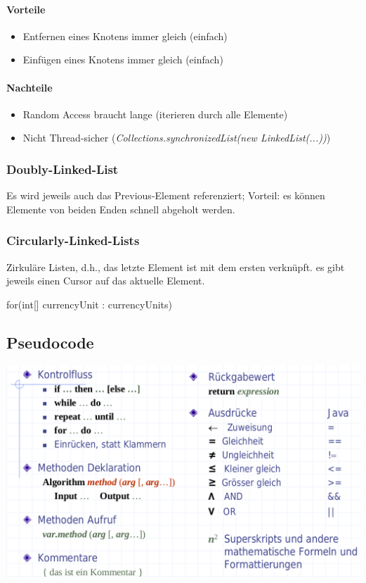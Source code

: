 \paragraph{Vorteile}
\begin{itemize}
	\item Entfernen eines Knotens immer gleich (einfach)
	\item Einfügen eines Knotens immer gleich (einfach)
\end{itemize}

\paragraph{Nachteile}
\begin{itemize}
	\item Random Access braucht lange (iterieren durch alle Elemente)
	\item Nicht Thread-sicher (\emph{Collections.synchronizedList(new LinkedList(...))})
\end{itemize}

\subsubsection{Doubly-Linked-List}

Es wird jeweils auch das Previous-Element referenziert; Vorteil: es können Elemente von beiden Enden schnell abgeholt werden.

\subsubsection{Circularly-Linked-Lists}

Zirkuläre Listen, d.h., das letzte Element ist mit dem ersten verknüpft. es gibt jeweils einen Cursor auf das aktuelle Element.

for(int[] currencyUnit : currencyUnits)   


\subsection{Pseudocode}
\includegraphics[scale=0.3]{img/pseudocode.png}

